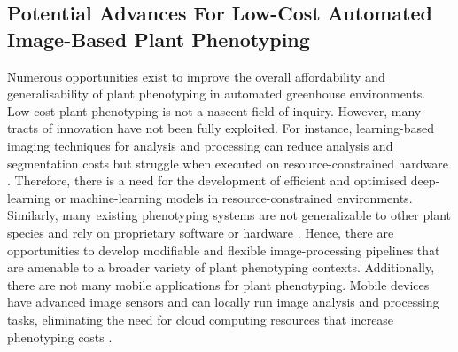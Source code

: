 \subsection{Potential Advances For Low-Cost Automated Image-Based Plant Phenotyping}
Numerous opportunities exist to improve the overall affordability and generalisability of plant phenotyping in automated greenhouse environments. Low-cost plant phenotyping is not a nascent field of inquiry. However, many tracts of innovation have not been fully exploited. For instance, learning-based imaging techniques for analysis and processing can reduce analysis and segmentation costs but struggle when executed on resource-constrained hardware \cite{nabwireReviewApplicationArtificial2021}. Therefore, there is a need for the development of efficient and optimised deep-learning or machine-learning models in resource-constrained environments. Similarly, many existing phenotyping systems are not generalizable to other plant species \cite{liReviewImagingTechniques2014, arvidssonGrowthPhenotypingPipeline2011a} and rely on proprietary software or hardware \cite{czedik-eysenbergPhenoBoxFlexibleAutomated2018}. Hence, there are opportunities to develop modifiable and flexible image-processing pipelines that are amenable to a broader variety of plant phenotyping contexts. Additionally, there are not many mobile applications for plant phenotyping. Mobile devices have advanced image sensors and can locally run image analysis and processing tasks, eliminating the need for cloud computing resources that increase phenotyping costs \cite{muller-linowPlantScreenMobile2019}.